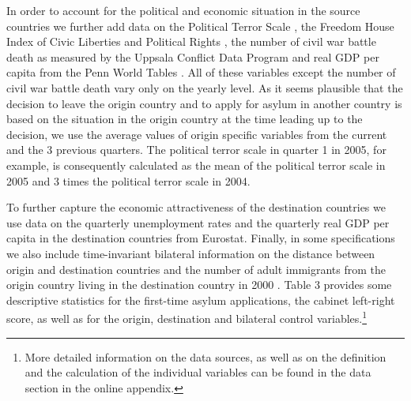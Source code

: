 \documentclass[a4paper,12pt]{article}
\begin{document}
In order to account for the political and economic situation in the source countries we further add data on the Political Terror Scale \citep{PTS2016} , the Freedom House Index of Civic Liberties and Political Rights \citep{FHI2017}, the number of civil war battle death  as measured by the Uppsala Conflict Data Program \citep{Uppsala2017} and real GDP per capita from the Penn World Tables \citep{PWT2015}.  All of these variables except the number of civil war battle death vary only on the yearly level. As it seems plausible that  the decision to leave the origin country and to apply for asylum in another country is based on the situation in the origin country at the time leading up to the decision, we use the average values of origin specific variables from the current and the 3 previous quarters. The political terror scale in quarter 1 in 2005, for example, is consequently calculated as the mean of the political terror scale in 2005 and 3 times the political terror scale in 2004. 

To further capture the economic attractiveness of the destination countries we use data on the quarterly unemployment rates and the quarterly real GDP per capita in the destination countries from Eurostat. Finally, in some specifications we also include time-invariant bilateral information on the distance between origin and destination countries \citep{distance2017} and the number of adult immigrants from the origin country living in the destination country in 2000 \citep{Artucc2015}. Table 3 provides some descriptive statistics for the first-time asylum applications, the cabinet left-right score, as well as for the origin, destination and bilateral control variables.\footnote{More detailed information on the data sources, as well as on the definition and the calculation of the individual variables can be found in the data section in the online appendix.}
\end{document}
